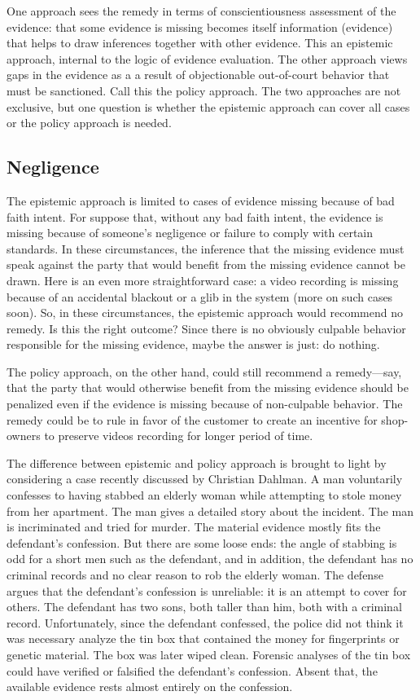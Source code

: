 \documentclass[
  10pt,
  dvipsnames,enabledeprecatedfontcommands]{scrartcl}
\begin{document}
One approach sees the remedy in terms of conscientiousness assessment of
the evidence: that some evidence is missing becomes itself information
(evidence) that helps to draw inferences together with other evidence.
This an epistemic approach, internal to the logic of evidence
evaluation. The other approach views gaps in the evidence as a a result
of objectionable out-of-court behavior that must be sanctioned. Call
this the policy approach. The two approaches are not exclusive, but one
question is whether the epistemic approach can cover all cases or the
policy approach is needed.

\hypertarget{negligence}{%
\subsection{Negligence}\label{negligence}}

The epistemic approach is limited to cases of evidence missing because
of bad faith intent. For suppose that, without any bad faith intent, the
evidence is missing because of someone's negligence or failure to comply
with certain standards. In these circumstances, the inference that the
missing evidence must speak against the party that would benefit from
the missing evidence cannot be drawn. Here is an even more
straightforward case: a video recording is missing because of an
accidental blackout or a glib in the system (more on such cases soon).
So, in these circumstances, the epistemic approach would recommend no
remedy. Is this the right outcome? Since there is no obviously culpable
behavior responsible for the missing evidence, maybe the answer is just:
do nothing.

The policy approach, on the other hand, could still recommend a
remedy---say, that the party that would otherwise benefit from the
missing evidence should be penalized even if the evidence is missing
because of non-culpable behavior. The remedy could be to rule in favor
of the customer to create an incentive for shop-owners to preserve
videos recording for longer period of time.

The difference between epistemic and policy approach is brought to light
by considering a case recently discussed by Christian Dahlman. A man
voluntarily confesses to having stabbed an elderly woman while
attempting to stole money from her apartment. The man gives a detailed
story about the incident. The man is incriminated and tried for murder.
The material evidence mostly fits the defendant's confession. But there
are some loose ends: the angle of stabbing is odd for a short men such
as the defendant, and in addition, the defendant has no criminal records
and no clear reason to rob the elderly woman. The defense argues that
the defendant's confession is unreliable: it is an attempt to cover for
others. The defendant has two sons, both taller than him, both with a
criminal record. Unfortunately, since the defendant confessed, the
police did not think it was necessary analyze the tin box that contained
the money for fingerprints or genetic material. The box was later wiped
clean. Forensic analyses of the tin box could have verified or falsified
the defendant's confession. Absent that, the available evidence rests
almost entirely on the confession.
\end{document}
